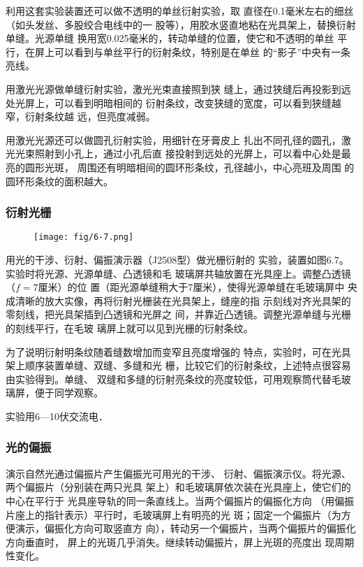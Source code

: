 利用这套实验装置还可以做不透明的单丝衍射实验，取
直径在0.1毫米左右的细丝（如头发丝、多股绞合电线中的一
股等），用胶水竖直地粘在光具架上，替换衍射单缝。光源单缝
换用宽0.025毫米的，转动单缝的位置，使它和不透明的单丝
平行，在屏上可以看到与单丝平行的衍射条纹，特别是在单丝
的“影子”中央有一条亮线。

用激光光源做单缝衍射实验，激光光束直接照到狭
缝上，通过狭缝后再投影到远处光屏上，可以看到明暗相间的
衍射条纹，改变狭缝的宽度，可以看到狭缝越窄，衍射条纹越
远，但亮度减弱。

用激光光源还可以做圆孔衍射实验，用细针在牙膏皮上
扎出不同孔径的圆孔，激光光束照射到小孔上，通过小孔后直
接投射到远处的光屏上，可以看中心处是最亮的圆形光斑，
周围还有明暗相间的圆环形条纹，孔径越小，中心亮班及周围
的圆环形条纹的面积越大。

\subsubsection{衍射光栅}
\begin{figure}[htp]
    \centering
    \texttt{[image: fig/6-7.png]}
    \caption{}
\end{figure}

用光的干涉、衍射、偏振演示器（J2508型）做光栅衍射的
实验，装置如图6.7。实验时将光源、光源单缝、凸透镜和毛
玻璃屏共轴放置在光具座上。调整凸透镜（$f=7$厘米）的位
置（距光源单缝稍大于7厘米），使得光源单缝在毛玻璃屏中
央成清晰的放大实像，再将衍射光栅装在光具架上，缝座的指
示刻线对齐光具架的零刻线，把光具架插到凸透镜和光屏之
间，并靠近凸透镜。调整光源单缝与光栅的刻线平行，在毛玻
璃屏上就可以见到光栅的衍射条纹。

为了说明衍射明条纹随着缝数增加而变窄且亮度增强的
特点，实验时，可在光具架上顺序装置单缝、双缝、多缝和光
栅，比较它们的衍射条纹，上述特点很容易由实验得到。单缝、
双缝和多缝的衍射亮条纹的亮度较低，可用观察筒代替毛玻
璃屏，便于同学观察。

实验用6—10伏交流电．

\subsubsection{光的偏振}

演示自然光通过偏振片产生偏振光可用光的干涉、
衍射、偏振演示仪。将光源、两个偏振片（分别装在两只光具
架上）和毛玻璃屏依次装在光具座上，使它们的中心在平行于
光具座导轨的同一条直线上。当两个偏振片的偏振化方向
（用偏振片座上的指针表示）平行时，毛玻璃屏上有明亮的光
斑；固定一个偏振片（为方便演示，偏振化方向可取竖直方
向），转动另一个偏振片，当两个偏振片的偏振化方向垂直时，
屏上的光斑几乎消失。继续转动偏振片，屏上光斑的亮度出
现周期性变化。

